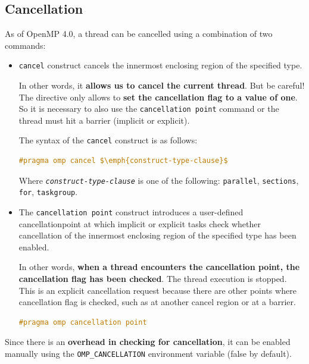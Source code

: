 \subsection{Cancellation}

As of OpenMP 4.0, a thread can be cancelled using a combination of two commands:
\begin{itemize}
    \item \texttt{cancel} construct cancels the innermost enclosing region of the specified type.
    
    In other words, it \textbf{allows us to cancel the current thread}. But be careful! The directive only allows to \textbf{set the cancellation flag to a value of one}. So it is necessary to also use the \texttt{cancellation point} command or the thread must hit a barrier (implicit or explicit).

    The syntax of the \texttt{cancel} construct is as follows:
    \begin{openmpbox}
        \begin{lstlisting}[language=C++, mathescape=true]
#pragma omp cancel $\emph{construct-type-clause}$\end{lstlisting}
        Where \texttt{\emph{construct-type-clause}} is one of the following: \texttt{parallel}, \texttt{sections}, \texttt{for}, \texttt{taskgroup}.
    \end{openmpbox}
    
    \item The \texttt{cancellation point} construct introduces a user-defined cancellation\break point at which implicit or explicit tasks check whether cancellation of the innermost enclosing region of the specified type has been enabled.

    In other words, \textbf{when a thread encounters the cancellation point, the cancellation flag has been checked}. The thread execution is stopped. This is an explicit cancellation request because there are other points where cancellation flag is checked, such as at another cancel region or at a barrier.
    \begin{openmpbox}
        \begin{lstlisting}[language=C++]
#pragma omp cancellation point\end{lstlisting}
    \end{openmpbox}
\end{itemize}
Since there is an \textbf{overhead in checking for cancellation}, it can be enabled manually using the \texttt{OMP\_CANCELLATION} environment variable (false by default).

